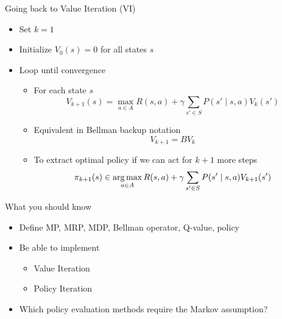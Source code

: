 \documentclass[aspectratio=169]{../latex_main/tntbeamer}  %
\begin{document}
\begin{frame}[c]{Going back to Value Iteration (VI)}

\begin{itemize}
	\item  Set $k = 1$
	\item Initialize $V_0(s) = 0$ for all states $s$
	\item Loop until convergence
	\begin{itemize}
		\item For each state $s$
		$$V_{k+1}(s) = \max_{a\in A } R(s,a) + \gamma \sum_{s' \in S } P(s' \mid s,a) V_k(s') $$
		\item Equivalent in Bellman backup notation
				$$ V_{k+1} = BV_k$$
		\item To extract optimal policy if we can act for $k+1$ more steps
		$$\pi_{k+1}(s) \in \operatorname*{arg\,max}_{a \in A} R(s,a) + \gamma \sum_{s' \in S} P(s' \mid s,a) V_{k+1}(s') $$
	\end{itemize}
	
\end{itemize}

\end{frame}
%
%
\begin{frame}[c]{What you should know}

\begin{itemize}
	\item  Define MP, MRP, MDP, Bellman operator, Q-value, policy
	\item Be able to implement
	\begin{itemize}
		\item Value Iteration
		\item Policy Iteration
	\end{itemize}
	\item Which policy evaluation methods require the Markov assumption?
\end{itemize}

\end{frame}
\end{document}
